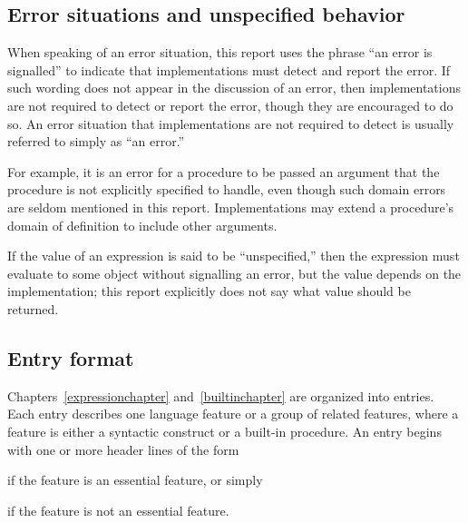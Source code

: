 \subsection{Error situations and unspecified behavior}

When speaking of an error situation, this report uses the phrase ``an
error is signalled'' to indicate that implementations must detect and
report the error.  If such wording does not appear in the discussion of
an error, then implementations are not required to detect or report the
error, though they are encouraged to do so.  An error situation that
implementations are not required to detect is usually referred to simply
as ``an error.''

\vest For example, it is an error for a procedure to be passed an argument that
the procedure is not explicitly specified to handle, even though such
domain errors are seldom mentioned in this report.  Implementations may
extend a procedure's domain of definition to include other arguments.

\vest If the value of an expression is said to be ``unspecified,'' then
the expression must evaluate to some object without signalling an error,
but the value depends on the implementation; this report explicitly does
not say what value should be returned.




\subsection{Entry format}

Chapters~\ref{expressionchapter} and~\ref{builtinchapter} are organized
into entries.  Each entry describes one language feature or a group of
related features, where a feature is either a syntactic construct or a
built-in procedure.  An entry begins with one or more header lines of the form

\noindent{}\unpenalty

if the feature is an essential feature, or simply

\noindent{}\unpenalty

if the feature is not an essential feature.

